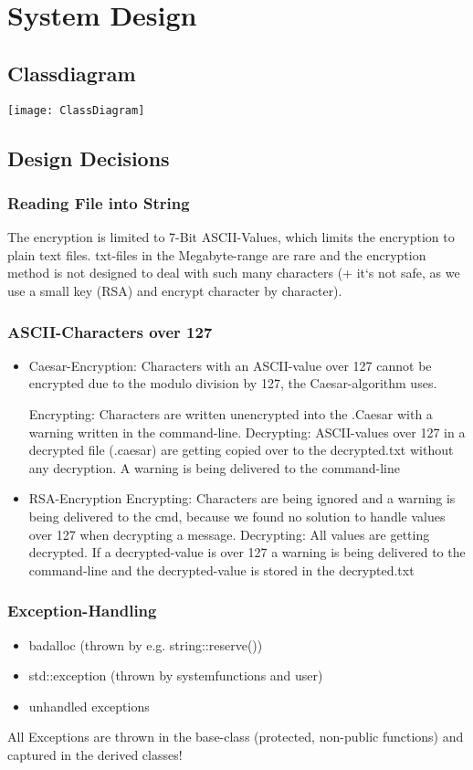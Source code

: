 \section{System Design}
\subsection{Classdiagram}
\texttt{[image: ClassDiagram]}

\subsection{Design Decisions}
\subsubsection{Reading File into String}
The encryption is limited to 7-Bit ASCII-Values, which limits the encryption to plain text files. txt-files in the Megabyte-range are rare and the encryption method is not designed to deal with such many characters (+ it`s not safe, as we use a small key (RSA) and encrypt character by character).
\subsubsection{ASCII-Characters over 127}
\begin{itemize}
	\item Caesar-Encryption:	Characters with an ASCII-value over 127 cannot be encrypted due to the modulo division by 127, the Caesar-algorithm uses.	
	
	\subitem Encrypting: Characters are written unencrypted into the .Caesar with a warning written 
	\subitem in the command-line. 
	\subitem Decrypting: ASCII-values over 127 in a decrypted file (.caesar) are getting copied over to the decrypted.txt without any decryption. 
			A warning is being delivered to the command-line

	\item RSA-Encryption
	\subitem Encrypting: Characters are being ignored and a warning is being delivered to the cmd, because we found no solution 
		to handle values over 127 when decrypting a message. 
	\subitem Decrypting: All values are getting decrypted. If a decrypted-value is over 127 a warning is being delivered to 
		the command-line and the decrypted-value is stored in the decrypted.txt

\end{itemize}

\subsubsection{Exception-Handling}
\begin{itemize}
	\item badalloc (thrown by e.g. string::reserve())
	\item std::exception (thrown by systemfunctions and user)
	\item unhandled exceptions
\end{itemize}
All Exceptions are thrown in the base-class (protected, non-public functions) and captured in the derived classes!

